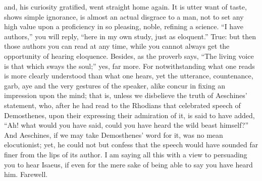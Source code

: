 and, his curiosity gratified, went straight home again. It is utter want
of taste, shows simple ignorance, is almost an actual disgrace to a man,
not to set any high value upon a proficiency in so pleasing, noble,
refining a science. ``I have authors,'' you will reply, ``here in my own
study, just as eloquent.'' True: but then those authors you can read at any
time, while you cannot always get the opportunity of hearing eloquence.
Besides, as the proverb says, ``The living voice is that which sways the
soul;'' yes, far more. For notwithstanding what one reads is more clearly
understood than what one hears, yet the utterance, countenance, garb, aye
and the very gestures of the speaker, alike concur in fixing an impression
upon the mind; that is, unless we disbelieve the truth of Aeschines'
statement, who, after he had read to the Rhodians that celebrated speech
of Demosthenes, upon their expressing their admiration of it, is said to
have added, ``Ah! what would you have said, could you have heard the wild
beast himself?'' And Aeschines, if we may take Demosthenes' word for it,
was no mean elocutionist; yet, he could not but confess that the speech
would have sounded far finer from the lips of its author. I am saying all
this with a view to persuading you to hear Isaeus, if even for the mere
sake of being able to say you have heard him. Farewell.


